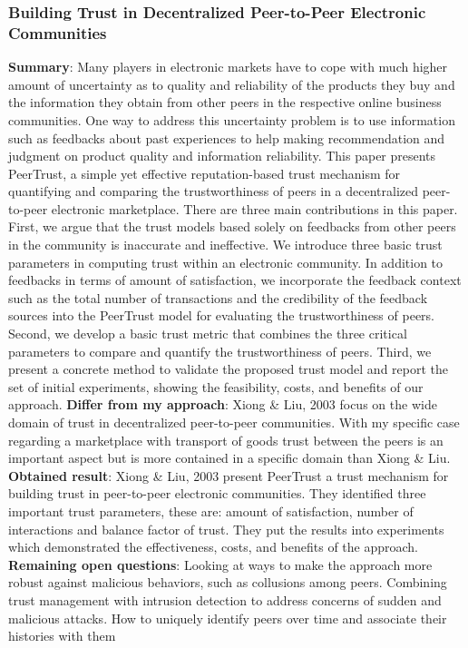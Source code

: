 \subsubsection{Building Trust in Decentralized Peer-to-Peer Electronic Communities \cite{buildTrust}}
\textbf{Summary}: Many players in electronic markets have to cope with much higher amount of uncertainty as to quality and reliability of the products they buy and the information they obtain from other peers in the respective online business communities. One way to address this uncertainty problem is to use information such as feedbacks about past experiences to help making recommendation and judgment on product quality and information reliability. This paper presents PeerTrust, a simple yet effective reputation-based trust mechanism for quantifying and comparing the trustworthiness of peers in a decentralized peer-to-peer electronic marketplace. There are three main contributions in this paper. First, we argue that the trust models based solely on feedbacks from other peers in the community is inaccurate and ineffective. We introduce three basic trust parameters in computing trust within an electronic community. In addition to feedbacks in terms of amount of satisfaction, we incorporate the feedback context such as the total number of transactions and the credibility of the feedback sources into the PeerTrust model for evaluating the trustworthiness of peers. Second, we develop a basic trust metric that combines the three critical parameters to compare and quantify the trustworthiness of peers. Third, we present a concrete method to validate the proposed trust model and report the set of initial experiments, showing the feasibility, costs, and benefits of our approach.\newline
\textbf{Differ from my approach}: Xiong \& Liu, 2003 focus on the wide domain of trust in decentralized peer-to-peer communities. With my specific case regarding a marketplace with transport of goods trust between the peers is an important aspect but is more contained in a specific domain than Xiong \& Liu.\newline
\textbf{Obtained result}: Xiong \& Liu, 2003 present PeerTrust a trust mechanism for building trust in peer-to-peer electronic communities. They identified three important trust parameters, these are: amount of satisfaction, number of interactions and balance factor of trust. They put the results into experiments which demonstrated the effectiveness, costs, and benefits of the approach.\newline
\textbf{Remaining open questions}: Looking at ways to make the approach more robust against malicious behaviors, such as collusions among peers. Combining trust management with intrusion detection to address concerns of sudden and malicious attacks. How to uniquely identify peers over time and associate their histories with them\newline

